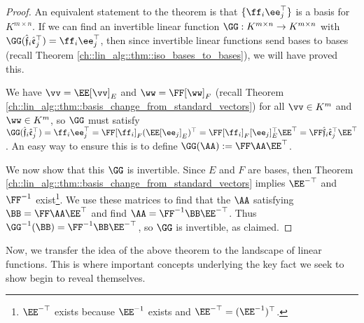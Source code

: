 \begin{proof}
    An equivalent statement to the theorem is that $\{\ff_i \ee_j^\top\}$ is a basis for $K^{m \times n}$. If we can find an invertible linear function $\GG:K^{m \times n} \rightarrow K^{m \times n}$ with $\GG(\sff_i \see_j^\top) = \ff_i \ee_j^\top$, then since invertible linear functions send bases to bases (recall Theorem \ref{ch::lin_alg::thm::iso_bases_to_bases}), we will have proved this.

    We have $\vv = \EE [\vv]_E$ and $\ww = \FF [\ww]_F$ (recall Theorem \ref{ch::lin_alg::thm::basis_change_from_standard_vectors}) for all $\vv \in K^m$ and $\ww \in K^m$, so $\GG$ must satisfy $\GG(\sff_i \see_j^\top) = \ff_i \ee_j^\top = \FF [\ff_i]_F (\EE [\ee_j]_E)^\top = \FF [\ff_i]_F [\ee_j]_E^\top \EE^\top = \FF \sff_i \see_j^\top \EE^\top$. An easy way to ensure this is to define $\GG(\AA) := \FF \AA \EE^\top$.

    We now show that this $\GG$ is invertible. Since $E$ and $F$ are bases, then Theorem \ref{ch::lin_alg::thm::basis_change_from_standard_vectors} implies $\EE^{-\top}$ and $\FF^{-1}$ exist\footnote{$\EE^{-\top}$ exists because $\EE^{-1}$ exists and $\EE^{-\top} = (\EE^{-1})^\top$.}. We use these matrices to find that the $\AA$ satisfying $\BB = \FF \AA \EE^\top$ and find $\AA = \FF^{-1} \BB \EE^{-\top}$. Thus $\GG^{-1}(\BB) = \FF^{-1} \BB \EE^{-\top}$, so $\GG$ is invertible, as claimed.
\end{proof}

Now, we transfer the idea of the above theorem to the landscape of linear functions. This is where important concepts underlying the key fact we seek to show begin to reveal themselves.


